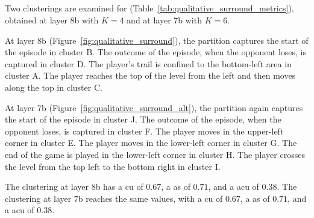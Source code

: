 \newpage
\subsection{\SurroundName}

Two clusterings are examined for \SurroundName (Table~\ref{tab:qualitative_surround_metrics}), obtained at layer 8b with $K=4$ and at layer 7b with $K=6$.

At layer 8b (Figure~\ref{fig:qualitative_surround}), the partition captures the start of the episode in cluster B.
The outcome of the episode, when the opponent loses, is captured in cluster D.
The player's trail is confined to the bottom-left area in cluster A.
The player reaches the top of the level from the left and then moves along the top in cluster C.

At layer 7b (Figure~\ref{fig:qualitative_surround_alt}), the partition again captures the start of the episode in cluster J.
The outcome of the episode, when the opponent loses, is captured in cluster F.
The player moves in the upper-left corner in cluster E.
The player moves in the lower-left corner in cluster G.
The end of the game is played in the lower-left corner in cluster H.
The player crosses the level from the top left to the bottom right in cluster I.

The clustering at layer 8b has a \gls{cu} of $0.67$, a \gls{as} of $0.71$, and a \gls{acu} of $0.38$.
The clustering at layer 7b reaches the same values, with a \gls{cu} of $0.67$, a \gls{as} of $0.71$, and a \gls{acu} of $0.38$.

